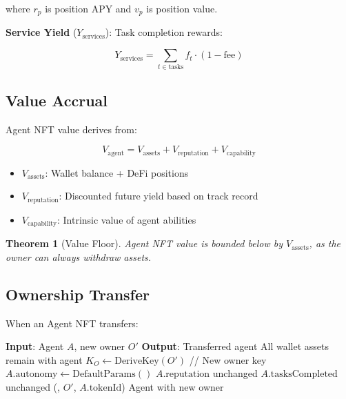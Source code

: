 \documentclass[11pt,letterpaper]{article}
\newtheorem{theorem}{Theorem}[section]
\begin{document}
where $r_p$ is position APY and $v_p$ is position value.

\textbf{Service Yield} ($Y_{\text{services}}$): Task completion rewards:

\begin{equation}
Y_{\text{services}} = \sum_{t \in \text{tasks}} f_t \cdot (1 - \text{fee})
\end{equation}

\subsection{Value Accrual}

Agent NFT value derives from:

\begin{equation}
V_{\text{agent}} = V_{\text{assets}} + V_{\text{reputation}} + V_{\text{capability}}
\end{equation}

\begin{itemize}
    \item $V_{\text{assets}}$: Wallet balance + DeFi positions
    \item $V_{\text{reputation}}$: Discounted future yield based on track record
    \item $V_{\text{capability}}$: Intrinsic value of agent abilities
\end{itemize}

\begin{theorem}[Value Floor]
Agent NFT value is bounded below by $V_{\text{assets}}$, as the owner can always withdraw assets.
\end{theorem}

\subsection{Ownership Transfer}

When an Agent NFT transfers:

\begin{algorithm}[t]
\caption{Agent NFT Transfer}
\label{alg:transfer}
\begin{algorithmic}[1]
\STATE \textbf{Input}: Agent $A$, new owner $O'$
\STATE \textbf{Output}: Transferred agent
\STATE {}
\STATE All wallet assets remain with agent
\STATE $K_O \leftarrow \text{DeriveKey}(O')$ // New owner key
\STATE {}
\STATE $A.\text{autonomy} \leftarrow \text{DefaultParams}()$
\STATE {}
\STATE $A.\text{reputation}$ unchanged
\STATE $A.\text{tasksCompleted}$ unchanged
\STATE {}
\STATE {}(, $O'$, $A.\text{tokenId}$)
\RETURN Agent with new owner
\end{algorithmic}
\end{algorithm}
\end{document}
